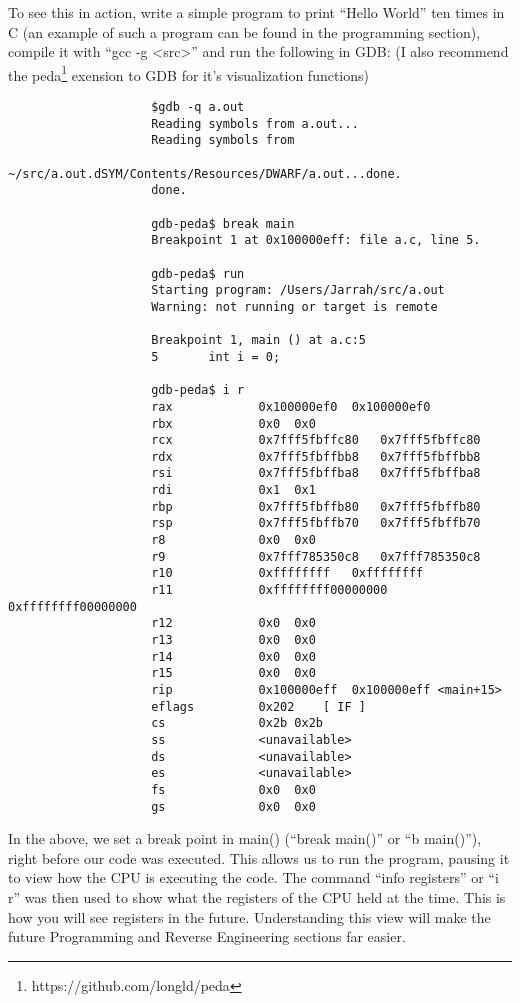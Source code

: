 \documentclass[a4paper,11pt]{report}
\begin{document}
				To see this in action, write a simple program to print ``Hello World'' ten times in C (an example of such a program can be found in the programming section), %
				compile it with ``gcc -g <src>'' and run the following in GDB: (I also recommend the peda\footnote{https://github.com/longld/peda} exension to GDB for it's visualization functions)				
				\begin{verbatim}
					$gdb -q a.out
					Reading symbols from a.out...
					Reading symbols from 
					~/src/a.out.dSYM/Contents/Resources/DWARF/a.out...done.
					done.

					gdb-peda$ break main
					Breakpoint 1 at 0x100000eff: file a.c, line 5.

					gdb-peda$ run
					Starting program: /Users/Jarrah/src/a.out
					Warning: not running or target is remote

					Breakpoint 1, main () at a.c:5
					5		int i = 0;

					gdb-peda$ i r
					rax            0x100000ef0	0x100000ef0
					rbx            0x0	0x0
					rcx            0x7fff5fbffc80	0x7fff5fbffc80
					rdx            0x7fff5fbffbb8	0x7fff5fbffbb8
					rsi            0x7fff5fbffba8	0x7fff5fbffba8
					rdi            0x1	0x1
					rbp            0x7fff5fbffb80	0x7fff5fbffb80
					rsp            0x7fff5fbffb70	0x7fff5fbffb70
					r8             0x0	0x0
					r9             0x7fff785350c8	0x7fff785350c8
					r10            0xffffffff	0xffffffff
					r11            0xffffffff00000000	0xffffffff00000000
					r12            0x0	0x0
					r13            0x0	0x0
					r14            0x0	0x0
					r15            0x0	0x0
					rip            0x100000eff	0x100000eff <main+15>
					eflags         0x202	[ IF ]
					cs             0x2b	0x2b
					ss             <unavailable>
					ds             <unavailable>
					es             <unavailable>
					fs             0x0	0x0
					gs             0x0	0x0

				\end{verbatim}
				In the above, we set a break point in main() (``break main()'' or ``b main()''), right before our code was executed. 
				This allows us to run the program, pausing it to view how the CPU is executing the code. 
				The command ``info registers'' or ``i r'' was then used to show what the registers of the CPU held at the time.
				This is how you will see registers in the future. 
				Understanding this view will make the future Programming and Reverse Engineering sections far easier. %
\end{document}
